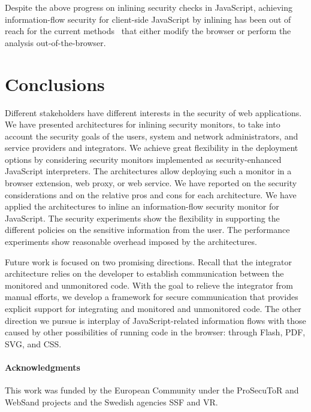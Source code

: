 \documentclass{llncs}
\begin{document}
Despite the above progress on inlining security checks in JavaScript, achieving
information-flow security for client-side JavaScript by inlining has been out of
reach for the current methods~\cite{Vogt+:NDSS07,DBLP:conf/pldi/ChughMJL09,Yip:Narula:Krohn:Morris:EUROSYS09,Jang+:CCS10,DeGroef+:CCS12}  that either
modify the browser or perform the analysis out-of-the-browser.

\section{Conclusions}
\label{sec:conc}
Different stakeholders have different interests in the security of web
applications. We have presented architectures for inlining security
monitors, to take into account the security goals of the users, system and
network administrators, and service providers and integrators.
%
We achieve great flexibility in the deployment options by considering
security monitors implemented as security-enhanced JavaScript interpreters.
%
The architectures allow deploying such a monitor in a browser
extension, web proxy, or web service.
%
We have reported on the security considerations and on the relative pros and
cons for each architecture.
%
We have applied the architectures to inline an information-flow
security monitor for JavaScript.
%
The security experiments show the
flexibility in supporting the different policies on the sensitive
information from the user. 
%
The performance experiments show reasonable overhead imposed by the
architectures.

Future work is focused on two promising directions. Recall that the
integrator architecture relies on the developer to establish
communication between the monitored and unmonitored code. With the
goal to relieve the integrator from manual efforts, we develop a
framework for secure communication that provides explicit support for
integrating and monitored and unmonitored code.
%
The other direction we pursue is interplay of JavaScript-related
information flows with those caused by other possibilities of running
code in the browser: through Flash, PDF, SVG, and CSS.

\vspace{-.2cm}
\paragraph{Acknowledgments}
This work was funded by 
the European Community under the ProSecuToR and WebSand projects
and
the Swedish agencies SSF and VR.




\end{document}

